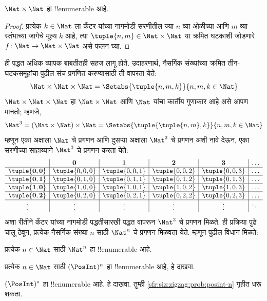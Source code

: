 \documentclass[../../../include/open-logic-section]{subfiles}
\begin{document}
\begin{prop}
$\Nat \times \Nat$ हा !!{enumerable} आहे.
\end{prop}

\begin{proof}
प्रत्येक $k \in \Nat$ ला कँटर यांच्या नागमोडी सरणीतील ज्या $n$ व्या
ओळीच्या आणि $m$ व्या स्तंभाच्या जागेचे मूल्य $k$ आहे, त्या
$\tuple{n,m} \in \Nat \times \Nat$ या क्रमित घटकाशी जोडणारे
$f \colon \Nat \to \Nat\times\Nat$ असे फलन घ्या.
\end{proof}

\begin{explain}
ही पद्धत अधिक व्यापक बाबतीतही सहज लागू होते. उदाहरणार्थ, नैसर्गिक
संख्यांच्या क्रमित तीन-घटकसमूहांचा पुढील संच प्रगणित करण्यासाठी ती
वापरता येते:
\[
\Nat \times \Nat \times \Nat = \Setabs{\tuple{n,m,k}}{n,m,k \in \Nat}
\]
$\Nat \times \Nat \times \Nat$ हा $\Nat \times \Nat$ आणि $\Nat$
यांचा कार्तीय गुणाकार आहे असे आपण मानतो; म्हणजे,
\[
\Nat^3 = (\Nat \times \Nat) \times \Nat =
\Setabs{\tuple{\tuple{n,m},k}}{n, m, k
  \in \Nat }
\]
म्हणून एका अक्षाला $\Nat$ चे प्रगणन आणि दुसऱ्या अक्षाला $\Nat^2$
चे प्रगणन अशी नावे देऊन, एका सरणीच्या साहाय्याने $\Nat^3$ चे
प्रगणन करता येते:
\[
\begin{array}{ c | c | c | c | c | c}
& \mathbf 0 & \mathbf 1 & \mathbf 2 & \mathbf 3 & \dots \\
\hline
\mathbf{\tuple{0,0}} & \tuple{0,0,0} & \tuple{0,0,1} & \tuple{0,0,2} & \tuple{0,0,3} & \dots \\
\hline
\mathbf{\tuple{0,1}} & \tuple{0,1,0} & \tuple{0,1,1} & \tuple{0,1,2} & \tuple{0,1,3} & \dots \\
\hline
\mathbf{\tuple{1,0}} & \tuple{1,0,0} & \tuple{1,0,1} & \tuple{1,0,2} & \tuple{1,0,3} & \dots \\
\hline
\mathbf{\tuple{0,2}} & \tuple{0,2,0} & \tuple{0,2,1} & \tuple{0,2,2} & \tuple{0,2,3} & \dots\\
\hline
\vdots & \vdots & \vdots & \vdots & \vdots & \ddots \\
\end{array}
\]
अशा रीतीने कँटर यांच्या नागमोडी पद्धतीसारखी पद्धत वापरून $\Nat^3$
चे प्रगणन मिळते. ही प्रक्रिया पुढे चालू ठेवून, प्रत्येक नैसर्गिक संख्या
$n$ साठी $\Nat^n$ चे प्रगणन मिळवता येते. म्हणून पुढील विधान मिळते:
\end{explain}

\begin{prop}
प्रत्येक $n \in \Nat$ साठी $\Nat^n$ हा !!{enumerable} आहे.
\end{prop}

\begin{prob}\label{sfr:siz:zigzag:prob:posint-n}
प्रत्येक $n \in \Nat$ साठी $(\PosInt)^n$ हा !!{enumerable} आहे, हे दाखवा.
\end{prob}

\begin{prob}\label{sfr:siz:zigzag:prob:posint-star}
  $(\PosInt)^*$ हा !!{enumerable} आहे, हे दाखवा. तुम्ही \cref{sfr:siz:zigzag:prob:posint-n} गृहीत धरू शकता.
\end{prob}
\end{document}
